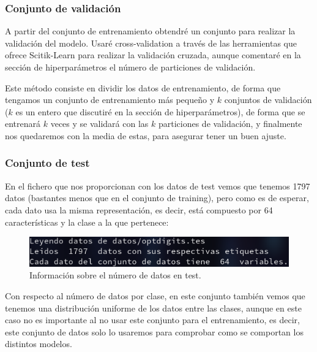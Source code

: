 \documentclass[12pt, spanish]{article}
\begin{document}
\subsubsection{Conjunto de validación}

A partir del conjunto de entrenamiento obtendré un conjunto para realizar la validación del modelo. Usaré cross-validation a través de las herramientas que ofrece Scitik-Learn para realizar la validación cruzada\cite{crossval}, aunque comentaré en la sección de hiperparámetros el número de particiones de validación. 

Este método consiste en dividir los datos de entrenamiento, de forma que tengamos un conjunto de entrenamiento más pequeño y $k$ conjuntos de validación ($k$ es un entero que discutiré en la sección de hiperparámetros), de forma que se entrenará $k$  veces y se validará con las $k$ particiones de validación, y finalmente nos quedaremos con la media de estas, para asegurar tener un buen ajuste.

\subsubsection{Conjunto de test}

En el fichero que nos proporcionan con los datos de test vemos que tenemos 1797 datos (bastantes menos que en el conjunto de training), pero como es de esperar, cada dato usa la misma representación, es decir, está compuesto por 64 características y la clase a la que pertenece:

\begin{figure}[H]
	\centering
	\includegraphics[scale=0.7]{clasificacion/num_datos_test.png}
	\caption{Información sobre el número de datos  en test.}
	\label{datosClasificacionTest}
\end{figure}


Con respecto al número de datos por clase, en este conjunto también vemos que tenemos una distribución uniforme de los datos entre las clases, aunque en este caso no es importante al no usar este conjunto para el entrenamiento, es decir, este conjunto de datos solo lo usaremos para comprobar como se comportan los distintos modelos.
\end{document}
